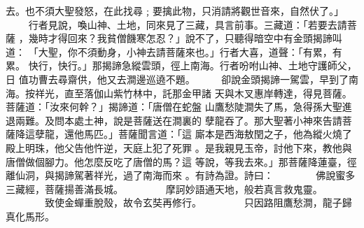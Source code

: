 \begin{pinyinscope}
{去。也不須大聖發怒，在此找尋﹔要擒此物，只消請將觀世音來，自然伏了。」
　　
行者見說，喚山神、土地，同來見了三藏，具言前事。三藏道：「若要去請菩薩
，幾時才得回來？我貧僧饑寒怎忍？」說不了，只聽得暗空中有金頭揭諦叫道：
「大聖，你不須動身，小神去請菩薩來也。」行者大喜，道聲：「有累，有累。
快行，快行。」那揭諦急縱雲頭，徑上南海。行者吩咐山神、土地守護師父，日
值功曹去尋齋供，他又去澗邊巡遶不題。
　　
卻說金頭揭諦一駕雲，早到了南海。按祥光，直至落伽山紫竹林中，託那金甲諸
天與木叉惠岸轉達，得見菩薩。菩薩道：「汝來何幹？」揭諦道：「唐僧在蛇盤
山鷹愁陡澗失了馬，急得孫大聖進退兩難。及問本處土神，說是菩薩送在澗裏的
孽龍吞了。那大聖著小神來告請菩薩降這孽龍，還他馬匹。」菩薩聞言道：「這
廝本是西海敖閏之子，他為縱火燒了殿上明珠，他父告他忤逆，天庭上犯了死罪
。是我親見玉帝，討他下來，教他與唐僧做個腳力。他怎麼反吃了唐僧的馬？這
等說，等我去來。」那菩薩降蓮臺，徑離仙洞，與揭諦駕著祥光，過了南海而來
。有詩為證。詩曰：
　　　　佛說蜜多三藏經，菩薩揚善滿長城。
　　　　摩訶妙語通天地，般若真言救鬼靈。
　　　　致使金蟬重脫殼，故令玄奘再修行。
　　　　只因路阻鷹愁澗，龍子歸真化馬形。

}
\end{pinyinscope}
